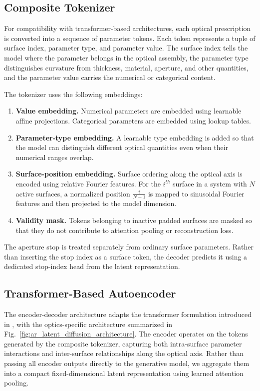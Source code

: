 \subsection{Composite Tokenizer}

For compatibility with transformer-based architectures, each optical prescription is converted into a sequence of parameter tokens. Each token represents a tuple of surface index, parameter type, and parameter value. The surface index tells the model where the parameter belongs in the optical assembly, the parameter type distinguishes curvature from thickness, material, aperture, and other quantities, and the parameter value carries the numerical or categorical content.

The tokenizer uses the following embeddings:
\begin{enumerate}
  \item \textbf{Value embedding.} Numerical parameters are embedded using learnable affine projections. Categorical parameters are embedded using lookup tables.
  \item \textbf{Parameter-type embedding.} A learnable type embedding is added so that the model can distinguish different optical quantities even when their numerical ranges overlap.
  \item \textbf{Surface-position embedding.} Surface ordering along the optical axis is encoded using relative Fourier features. For the $i^{th}$ surface in a system with $N$ active surfaces, a normalized position $\frac{i}{N-1}$ is mapped to sinusoidal Fourier features and then projected to the model dimension.
  \item \textbf{Validity mask.} Tokens belonging to inactive padded surfaces are masked so that they do not contribute to attention pooling or reconstruction loss.
\end{enumerate}

The aperture stop is treated separately from ordinary surface parameters. Rather than inserting the stop index as a surface token, the decoder predicts it using a dedicated stop-index head from the latent representation.

\subsection{Transformer-Based Autoencoder}
The encoder-decoder architecture adapts the transformer formulation introduced in \cite{vaswani2023attentionneed}, with the optics-specific architecture summarized in Fig.~\ref{fig:ar_latent_diffusion_architecture}. The encoder operates on the tokens generated by the composite tokenizer, capturing both intra-surface parameter interactions and inter-surface relationships along the optical axis. Rather than passing all encoder outputs directly to the generative model, we aggregate them into a compact fixed-dimensional latent representation using learned attention pooling.

